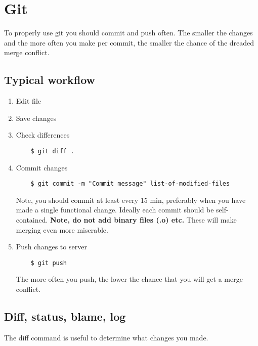 \chapter{Git}
\label{git}

To properly use git you should commit and push often. The smaller the
changes and the more often you make per commit, the smaller the chance
of the dreaded merge conflict.


\section{Typical workflow}

\begin{enumerate}
\item Edit file

\item Save changes  

\item Check differences
  
\begin{verbatim}  
    $ git diff .
\end{verbatim}
  
\item Commit changes 

\begin{verbatim}  
    $ git commit -m "Commit message" list-of-modified-files
\end{verbatim}

Note, you should commit at least every 15 min, preferably when you
have made a single functional change.  Ideally each commit should be
self-contained.  \textbf{Note, do not add binary files (.o) etc.}
These will make merging even more miserable.
  
\item Push changes to server

\begin{verbatim}    
    $ git push
\end{verbatim}

The more often you push, the lower the chance that you will get a
merge conflict.
  
\end{enumerate}


\section{Diff, status, blame, log}

The diff command is useful to determine what changes you made.

